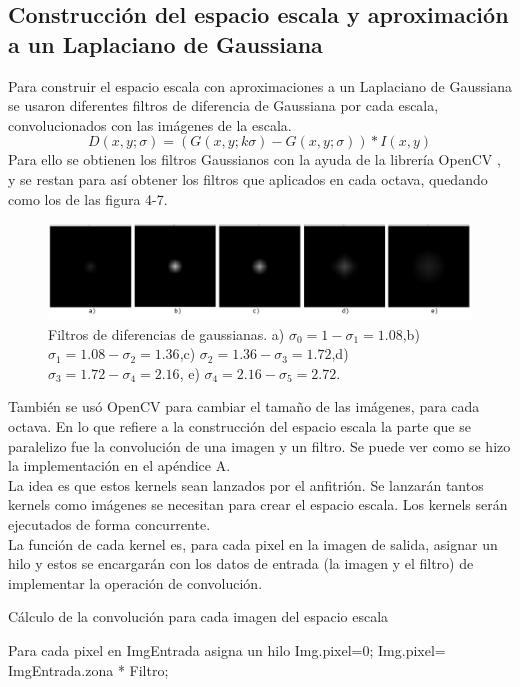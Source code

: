\subsection{Construcción del espacio escala y aproximación a un Laplaciano de Gaussiana}
Para construir el espacio escala con aproximaciones a un Laplaciano de Gaussiana se usaron  diferentes filtros de diferencia de Gaussiana por cada escala, convolucionados con las imágenes de la escala.  
$$D(x,y;\sigma) = (G(x,y;k\sigma) - G(x,y;\sigma)) * I(x,y)$$ 
Para ello se obtienen los filtros Gaussianos con la ayuda de la librería OpenCV \cite{Opencv}, y se restan para así obtener los filtros que aplicados en cada octava, quedando como los de las figura 4-7.\\
 \begin{figure}[H]
 			\centering
 				\includegraphics[width=\textwidth]{img/DoG.jpg}
 			\caption{Filtros de diferencias de gaussianas. a) $\sigma_{0}=1-\sigma_{1}=1.08$,b) $\sigma_{1}=1.08-\sigma_{2}=1.36$,c) $\sigma_{2}=1.36-\sigma_{3}=1.72$,d) $\sigma_{3}=1.72-\sigma_{4}=2.16$, e) $\sigma_{4}=2.16-\sigma_{5}=2.72$. }
 \end{figure}
También se usó OpenCV para cambiar el tamaño de las imágenes, para cada octava.
En lo que refiere a la construcción del espacio escala la parte que se paralelizo fue la convolución de una imagen y un filtro. Se puede ver como se hizo la implementación en el apéndice A.\\   
La idea es que estos kernels sean lanzados por el anfitrión. Se lanzarán tantos kernels como imágenes se necesitan para crear el espacio escala. Los kernels serán ejecutados de forma concurrente.\\
La función de cada kernel es, para cada pixel en la imagen de salida, asignar un hilo y estos se encargarán con los datos de entrada (la imagen y el filtro) de implementar la operación de convolución.\\
\begin{algorithm}[H]
\caption{Cálculo de la convolución para cada imagen del espacio escala}
 Para cada pixel en ImgEntrada asigna un hilo\;
 {
	{
		Img.pixel=0;
	}{
		Img.pixel= ImgEntrada.zona * Filtro; 
	}
 }
\end{algorithm}

